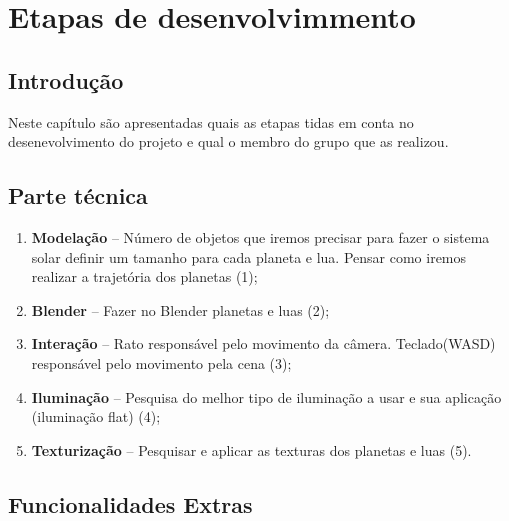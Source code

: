 \chapter{Etapas de desenvolvimmento}
\label{chap:tecno-ferra}

\section{Introdução}
\label{chap3:sec:intro}
Neste capítulo são apresentadas quais as etapas tidas em conta no desenevolvimento do projeto e qual o membro do  grupo que as realizou.

\section{Parte técnica}
\label{chap3:sec:...}

\begin{enumerate}
    \item \textbf{Modelação} -- Número de objetos que iremos precisar para fazer o sistema solar definir um tamanho para cada planeta e lua. Pensar como iremos realizar a trajetória dos planetas (1);
    \item \textbf{Blender} -- Fazer no Blender planetas e luas (2);
    \item \textbf{Interação} -- Rato responsável pelo movimento da câmera. Teclado(WASD) responsável pelo movimento pela cena (3);
    \item \textbf{Iluminação} --  Pesquisa do melhor tipo de iluminação a usar e sua aplicação (iluminação flat) (4);
    \item \textbf{Texturização} -- Pesquisar e aplicar as texturas dos planetas e luas (5).
\end{enumerate}

\section{Funcionalidades Extras}


